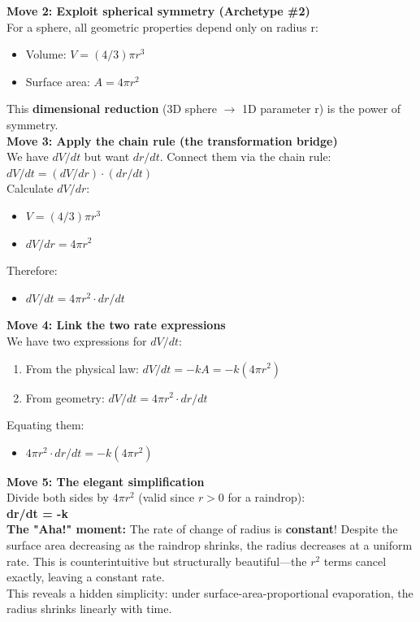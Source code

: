 \documentclass{article}
\begin{document}
\noindent \textbf{Move 2: Exploit spherical symmetry (Archetype \#2)} \\
For a sphere, all geometric properties depend only on radius r:
\begin{itemize}
    \item Volume: $V = (4/3)\pi r^3$
    \item Surface area: $A = 4\pi r^2$
\end{itemize}
This \textbf{dimensional reduction} (3D sphere $\to$ 1D parameter r) is the power of symmetry. \\

\noindent \textbf{Move 3: Apply the chain rule (the transformation bridge)} \\
We have $dV/dt$ but want $dr/dt$. Connect them via the chain rule: \\
$dV/dt = (dV/dr) \cdot (dr/dt)$ \\
Calculate $dV/dr$:
\begin{itemize}
    \item $V = (4/3)\pi r^3$
    \item $dV/dr = 4\pi r^2$
\end{itemize}
Therefore:
\begin{itemize}
    \item $dV/dt = 4\pi r^2 \cdot dr/dt$
\end{itemize}

\noindent \textbf{Move 4: Link the two rate expressions} \\
We have two expressions for $dV/dt$:
\begin{enumerate}
    \item From the physical law: $dV/dt = -kA = -k(4\pi r^2)$
    \item From geometry: $dV/dt = 4\pi r^2 \cdot dr/dt$
\end{enumerate}
Equating them:
\begin{itemize}
    \item $4\pi r^2 \cdot dr/dt = -k(4\pi r^2)$
\end{itemize}

\noindent \textbf{Move 5: The elegant simplification} \\
Divide both sides by $4\pi r^2$ (valid since $r > 0$ for a raindrop): \\
\textbf{dr/dt = -k} \\

\noindent \textbf{The "Aha!" moment:} The rate of change of radius is \textbf{constant}! Despite the surface area decreasing as the raindrop shrinks, the radius decreases at a uniform rate. This is counterintuitive but structurally beautiful—the $r^2$ terms cancel exactly, leaving a constant rate. \\
This reveals a hidden simplicity: under surface-area-proportional evaporation, the radius shrinks linearly with time.
\end{document}
